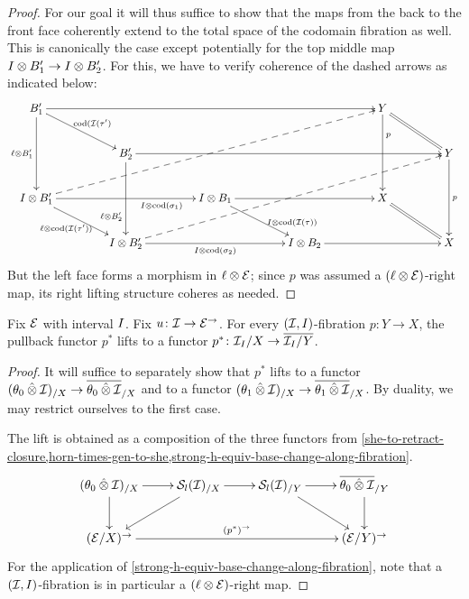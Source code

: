\documentclass[reqno,10pt,a4paper,oneside]{amsart}
\begin{document}
\begin{proof}
For our goal it will thus suffice to show that the maps from the back to the front face coherently extend to the total space of the codomain fibration as well.
This is canonically the case except potentially for the top middle map $\interval \otimes B_1' \to \interval \otimes B_2'$.
For this, we have to verify coherence of the dashed arrows as indicated below:
\[
\xymatrix@C+2em{
  B_1'
  \ar[rrrr]
  \ar[dd]_{\intervall \otimes B_1'}
  \ar[dr]^{\cod(\cal{I}(\tau')}
&&&&
  Y
  \ar[dd]^(0.3){p}
  \ar@{=}[dr]
\\&
  B_2'
  \ar[rrrr]
  \ar[dd]_(0.7){\intervall \otimes B_2'}
&&&&
  Y
  \ar[dd]^{p}
\\
  \interval \otimes B_1'
  \ar[rr]_(0.7){I \otimes \cod(\sigma_1)}
  \ar@{-->}[uurrrr]
  \ar[dr]_{\intervall \otimes \cod(\cal{I}(\tau'))}
&&
  \interval \otimes B_1
  \ar[rr]
  \ar[dr]^(0.7){\interval \otimes \cod(\cal{I}(\tau))}
&&
  X
  \ar@{=}[dr]
\\&
  \interval \otimes B_2'
  \ar[rr]_{I \otimes \cod(\sigma_2)}
  \ar@{-->}[uurrrr]
&&
  \interval \otimes B_2
  \ar[rr]
&&
  X
}
\]
But the left face forms a morphism in $\intervall \otimes \catE$; since $p$ was assumed a $(\intervall \otimes \catE)$-right map, its right lifting structure coheres as needed.
\end{proof}

\begin{theorem}
Fix $\cal{E}$ with interval $\interval$.
Fix $u \co \cal{I} \to \cal{E}^\to$.
For every $(\cal{I}, I)$-fibration $p : Y \to X$, the pullback functor $p^*$ lifts to a functor $p^* \co \cal{I}_I/X \to \overline{\cal{I}_I/Y}$.
\end{theorem}

\begin{proof}
It will suffice to separately show that $p^*$ lifts to a functor $(\thetal \hatotimes \cal{I})_{/X} \to \overline{\thetal \hatotimes \cal{I}}_{/X}$ and to a functor $(\thetar \hatotimes \cal{I})_{/X} \to \overline{\thetar \hatotimes \cal{I}}_{/X}$.
By duality, we may restrict ourselves to the first case.

The lift is obtained as a composition of the three functors from \cref{she-to-retract-closure,horn-times-gen-to-she,strong-h-equiv-base-change-along-fibration}.
\[
\xymatrix{
  (\thetal \hatotimes \cal{I})_{/X}
  \ar[r]
  \ar[d]
&
  \cal{S}_l(\cal{I})_{/X}
  \ar[r]
  \ar[dl]
&
  \cal{S}_l(\cal{I})_{/Y}
  \ar[r]
  \ar[dr]
&
  \overline{\thetal \hatotimes \cal{I}}_{/Y}
  \ar[d]
\\
  (\catE/X)^{\to}
  \ar[rrr]^{(p^*)^{\to}}
&&&
  (\catE/Y)^{\to}
}
\]
For the application of \cref{strong-h-equiv-base-change-along-fibration}, note that a $(\cal{I}, \interval)$-fibration is in particular a $(\intervall \otimes \calE)$-right map.
\end{proof}
\end{document}
